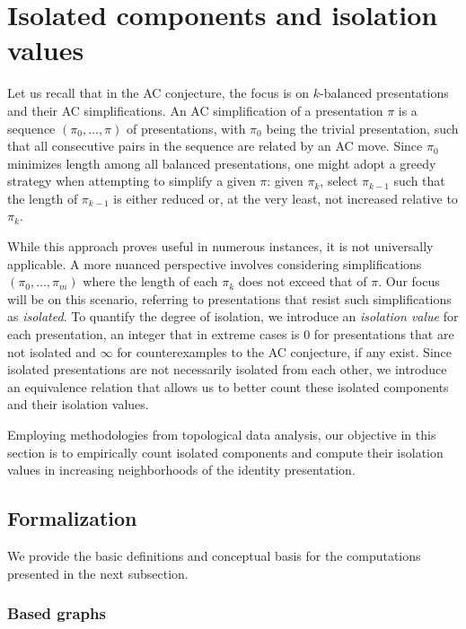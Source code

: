 
\section{Isolated components and isolation values}\label{sec:isolated}

Let us recall that in the AC conjecture, the focus is on $k$-balanced presentations and their AC simplifications.
An AC simplification of a presentation $\pi$ is a sequence $(\pi_0, \dots, \pi)$ of presentations, with $\pi_0$ being the trivial presentation, such that all consecutive pairs in the sequence are related by an AC move.
Since $\pi_0$ minimizes length among all balanced presentations, one might adopt a greedy strategy when attempting to simplify a given $\pi$: given $\pi_k$, select $\pi_{k-1}$ such that the length of $\pi_{k-1}$ is either reduced or, at the very least, not increased relative to $\pi_k$.

While this approach proves useful in numerous instances, it is not universally applicable.
A more nuanced perspective involves considering simplifications $(\pi_0, \dots, \pi_m)$ where the length of each $\pi_k$ does not exceed that of $\pi$.
Our focus will be on this scenario, referring to presentations that resist such simplifications as \textit{isolated}.
To quantify the degree of isolation, we introduce an \textit{isolation value} for each presentation, an integer that in extreme cases is $0$ for presentations that are not isolated and $\infty$ for counterexamples to the AC conjecture, if any exist.
Since isolated presentations are not necessarily isolated from each other, we introduce an equivalence relation that allows us to better count these isolated components and their isolation values.

Employing methodologies from topological data analysis, our objective in this section is to empirically count isolated components and compute their isolation values in increasing neighborhoods of the identity presentation.

\subsection{Formalization}

We provide the basic definitions and conceptual basis for the computations presented in the next subsection.

\subsubsection{Based graphs}

